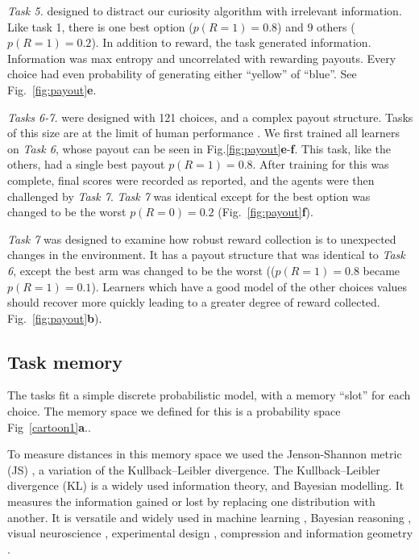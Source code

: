 \textit{Task 5.} designed to distract our curiosity algorithm with irrelevant information. Like task 1, there is one best option ($p(R=1) = 0.8$) and 9 others ($p(R=1) = 0.2$). In addition to reward, the task generated information. Information was max entropy and uncorrelated with rewarding payouts. Every choice had even probability of generating either ``yellow'' of ``blue''. See Fig.~\ref{fig:payout}\textbf{e}.  

\textit{Tasks 6-7.} were designed with 121 choices, and a complex payout structure. Tasks of this size are at the limit of human performance \citep{Wu2018}. We first trained all learners on \textit{Task 6}, whose payout can be seen in Fig.\ref{fig:payout}\textbf{e}-\textbf{f}. This task, like the others, had a single best payout $p(R=1) = 0.8$. After training for this was complete, final scores were recorded as reported, and the agents were then challenged by \textit{Task 7}. \textit{Task 7} was identical except for the best option was changed to be the worst $p(R=0) = 0.2$ (Fig.~\ref{fig:payout}\textbf{f}). 

\textit{Task 7} was designed to examine how robust reward collection is to unexpected changes in the environment. It has a payout structure that was identical to \textit{Task 6}, except the best arm was changed to be the worst (($p(R=1) = 0.8$ became $p(R=1) = 0.1$). Learners which have a good model of the other choices values should recover more quickly leading to a greater degree of reward collected. Fig.~\ref{fig:payout}\textbf{b}). 

\subsection*{Task memory}
The tasks fit a simple discrete probabilistic model, with a memory “slot” for each choice. The memory space we defined for this is a probability space Fig~\ref{cartoon1}\textbf{a}..

To measure distances in this memory space we used the Jenson-Shannon metric (JS) \citep{Endres2003}, a variation of the Kullback--Leibler divergence. The Kullback--Leibler divergence (KL) is a widely used information theory, and Bayesian modelling. It measures the information gained or lost by replacing one distribution with another. It is versatile and widely used in machine learning \citep{Goodfellow-et-al-2016}, Bayesian reasoning \citep{Itti2009}, visual neuroscience \citep{Itti2009}, experimental design \citep{Lopez-Fidalgo2007}, compression \citep{Mackay,Still2012} and information geometry \citep{Ay2015}.


